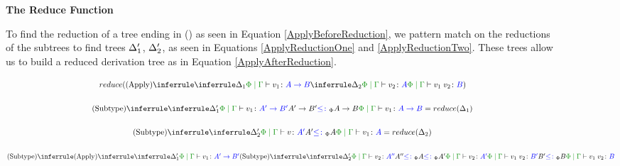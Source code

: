 \begin{figure}[H]
    \begin{framed}
        \begin{center}
            \textbf{The Reduce Function}   \par
        \end{center}

    \case{\vapply}
    To find the reduction of a tree ending in (\textit{\vapply}) as seen in Equation \ref{ApplyBeforeReduction}, we pattern match on the reductions of the subtrees to find trees $\Delta_1'$, $\Delta_2'$, as seen in Equations \ref{ApplyReductionOne} and \ref{ApplyReductionTwo}. These trees allow us to build a reduced derivation tree as in Equation \ref{ApplyAfterReduction}.

    \begin{equation}\label{ApplyBeforeReduction}
        \scalebox{.8}{$
        \reduce(\ntreeruleII{\vapply}{
            \treeruleI{\D_1}{
                \gpetyperelation{v_1}{\ab}
            }
        }{
            \treeruleI{\D_2}{
                \gpetyperelation{v_2}{A}
            }
        }{
            \gpetyperelation{\apply{v_1}{v_2}}{B}
        })
        $}
    \end{equation}

    \begin{equation}\label{ApplyReductionOne}
        \scalebox{.8}{$
            \ntreeruleII{\vsubtype}{
                \treeruleI{\D'_1}{\gpetyperelation{v_1}{\fntype{A'}{B'}}}
            }{
                \fntype{A'}{B'}\subtypep\fntype{A}{B}
            }{
                \gpetyperelation{v_1}{\ab}
            }  = \reduce(\D_1)
            $}
    \end{equation}

    \begin{equation}\label{ApplyReductionTwo}
        \scalebox{.8}{$
        \ntreeruleII{\vsubtype}{
            \treeruleI{\D'_2}{\gpetyperelation{v}{A'}}
        }{
            A'\subtypep A
        }{
            \gpetyperelation{v_1}{A}
        } = \reduce(\D_2)
        $}
    \end{equation}


    \begin{equation}\label{ApplyAfterReduction}
        \scalebox{.8}{$
        \ntreeruleII{\vsubtype}{
            \ntreeruleII{\vapply}{
                \treeruleI{
                    \D'_1
                }{
                    \gpetyperelation{v_1}{\fntype{A'}{B'}}
                }
            }{
                \ntreeruleII{\vsubtype}{
                    \treeruleI{\D'_2}{\gpetyperelation{v_2}{A''}}
                }{
                    A'' \subtypep A \subtypep A'
                } {
                    \gpetyperelation{v_2}{A'}
                }
            }{
                \gpetyperelation{\apply{v_1}{v_2}}{B'}
            }
        }{
            B' \subtypep B
        }{
            \gpetyperelation{\apply{v_1}{v_2}}{B}
        }
        $}
    \end{equation}


\end{framed}
\end{figure}

